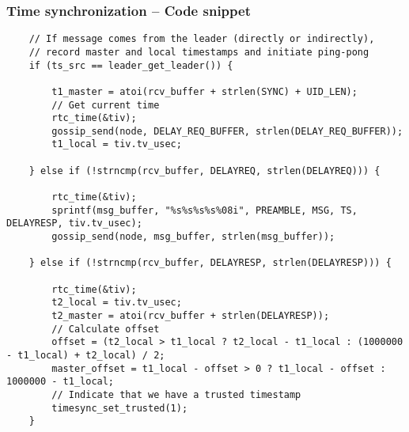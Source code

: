 \documentclass[ngerman,xcolor=svgnames]{beamer}
\begin{document}
\begin{frame}[fragile]
  \frametitle{Time synchronization -- Code snippet}
  \begin{lstlisting}
    // If message comes from the leader (directly or indirectly),
    // record master and local timestamps and initiate ping-pong
    if (ts_src == leader_get_leader()) {

        t1_master = atoi(rcv_buffer + strlen(SYNC) + UID_LEN);
        // Get current time
        rtc_time(&tiv);
        gossip_send(node, DELAY_REQ_BUFFER, strlen(DELAY_REQ_BUFFER));
        t1_local = tiv.tv_usec;

    } else if (!strncmp(rcv_buffer, DELAYREQ, strlen(DELAYREQ))) {

        rtc_time(&tiv);
        sprintf(msg_buffer, "%s%s%s%s%08i", PREAMBLE, MSG, TS, DELAYRESP, tiv.tv_usec);
        gossip_send(node, msg_buffer, strlen(msg_buffer));

    } else if (!strncmp(rcv_buffer, DELAYRESP, strlen(DELAYRESP))) {

        rtc_time(&tiv);
        t2_local = tiv.tv_usec;
        t2_master = atoi(rcv_buffer + strlen(DELAYRESP));
        // Calculate offset
        offset = (t2_local > t1_local ? t2_local - t1_local : (1000000 - t1_local) + t2_local) / 2;
        master_offset = t1_local - offset > 0 ? t1_local - offset : 1000000 - t1_local;
        // Indicate that we have a trusted timestamp
        timesync_set_trusted(1);
    }
  \end{lstlisting}
\end{frame}




\end{document}
